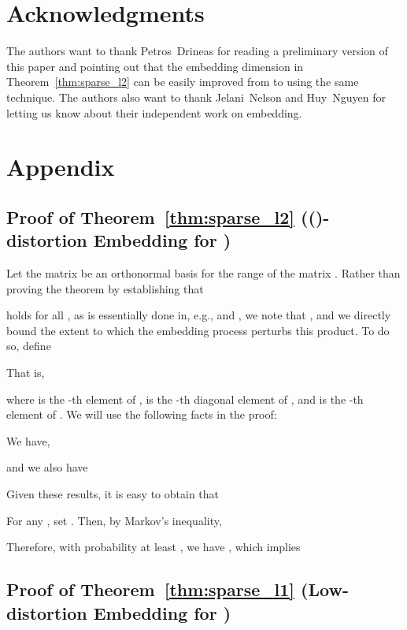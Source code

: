 \documentclass[11pt]{article}
\begin{document}
\section{Acknowledgments}

The authors want to thank Petros~Drineas for reading a preliminary version of
this paper and pointing out that the embedding dimension in
Theorem~\ref{thm:sparse_l2} can be easily improved from 
to  using the same technique.
The authors also want to thank Jelani~Nelson and Huy~Nguyen for letting us know
about their independent work on  embedding.







\appendix
\section{Appendix}


\subsection{Proof of Theorem~\ref{thm:sparse_l2} (()-distortion Embedding for )}
\label{sec:proof_l2}

Let the  matrix  be an orthonormal basis for the range of the  matrix . 
Rather than proving the theorem by establishing that
 
holds for all , as is essentially done in, e.g., \cite{DMM06} and
\cite{CW12sparse_TR}, we note that , and we directly bound the extent
to which the embedding process perturbs this product.
To do so, define

That is,

where  is the -th element of ,  is the -th diagonal
element of , and  is the -th element of .
We will use the following facts in the proof:

We have,

and we also have

Given these results, it is easy to obtain that 

For any , set .
Then, by Markov's inequality,

Therefore, with probability at least , we have , which implies



\subsection{Proof of Theorem~\ref{thm:sparse_l1} (Low-distortion Embedding for )}
\label{sec:proof_l1}
\end{document}
